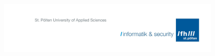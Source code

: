 

\pagestyle{empty}

\begin{figure}[H]
\vspace*{-2.5cm}
\hspace*{2.5cm}
\includegraphics[keepaspectratio, width=1.4\textwidth, right]{TemplateElements/logo_info_sec.png}
\end{figure}



